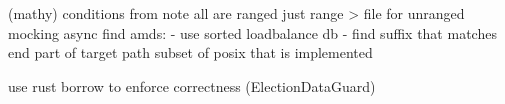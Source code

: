 (mathy) conditions from 
note all are ranged just range > file for unranged
mocking
async
find amds: 
	- use sorted loadbalance db
	- find suffix that matches end part of target path
subset of \ac{posix} that is implemented

use rust borrow to enforce correctness (ElectionDataGuard)
